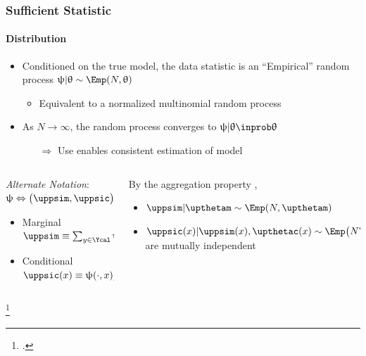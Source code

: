 \documentclass[aspectratio=169]{beamer}
\begin{document}
\begin{frame}
\frametitle{Sufficient Statistic}
\framesubtitle{Distribution}

\begin{itemize}
\item Conditioned on the true model, the data statistic is an ``Empirical'' random process $\uppsi | \uptheta \sim \Emp(N,\uptheta)$
\begin{itemize}
\item Equivalent to a normalized multinomial random process 
\end{itemize}
\item As $N \to \infty$, the random process converges to $\uppsi | \uptheta \inprob \uptheta$
\begin{itemize}
\item [$\Rightarrow$] Use enables \alert{consistent} estimation of model
\end{itemize}

\end{itemize}



\hrulefill
\vspace{.5em}

\begin{columns}[c]

\begin{column}{.5\linewidth}
\textit{Alternate Notation}: $\uppsi \Leftrightarrow \big( \uppsim,\uppsic \big)$
\begin{itemize}
\item Marginal $\uppsim \equiv \sum_{y \in \Ycal} \uppsi(y,\cdot)$
\item Conditional $\uppsic(x) \equiv \uppsi(\cdot,x) / \uppsim(x)$
\end{itemize}
\end{column}

\begin{column}{.5\linewidth}
By the aggregation property \footnotemark,
\begin{itemize}
\item $\uppsim | \upthetam \sim \Emp(N,\upthetam)$
\item $\uppsic(x) | \uppsim(x),\upthetac(x) \sim \Emp\big( N \uppsim(x),\upthetac(x) \big)$ are mutually \alert{independent}
\end{itemize}
\end{column}

\end{columns}

\footcitetext{johnson}

\end{frame}
\end{document}
